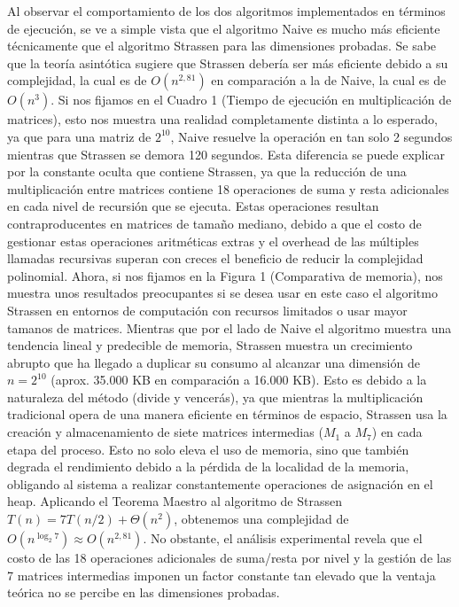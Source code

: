 Al observar el comportamiento de los dos algoritmos implementados en términos de ejecución, se ve a simple vista que el algoritmo Naive es mucho más eficiente técnicamente que el algoritmo Strassen para las dimensiones probadas. Se sabe que la teoría asintótica sugiere que Strassen debería ser más eficiente debido a su complejidad, la cual es de $O(n^{2,81})$ en comparación a la de Naive, la cual es de $O(n^3)$. Si nos fijamos en el Cuadro 1 (Tiempo de ejecución en multiplicación de matrices), esto nos muestra una realidad completamente distinta a lo esperado, ya que para una matriz de $2^{10}$, Naive resuelve la operación en tan solo 2 segundos mientras que Strassen se demora 120 segundos. Esta diferencia se puede explicar por la constante oculta que contiene Strassen, ya que la reducción de una multiplicación entre matrices contiene 18 operaciones de suma y resta adicionales en cada nivel de recursión que se ejecuta. Estas operaciones resultan contraproducentes en matrices de tamaño mediano, debido a que el costo de gestionar estas operaciones aritméticas extras y el overhead de las múltiples llamadas recursivas superan con creces el beneficio de reducir la complejidad polinomial. 
Ahora, si nos fijamos en la Figura 1 (Comparativa de memoria), nos muestra unos resultados preocupantes si se desea usar en este caso el algoritmo Strassen en entornos de computación con recursos limitados o usar mayor tamanos de matrices. Mientras que por el lado de Naive el algoritmo muestra una tendencia lineal y predecible de memoria, Strassen muestra un crecimiento abrupto que ha llegado a duplicar su consumo al alcanzar una dimensión de $n = 2^{10}$ (aprox. 35.000 KB en comparación a 16.000 KB). Esto es debido a la naturaleza del método (divide y vencerás), ya que mientras la multiplicación tradicional opera de una manera eficiente en términos de espacio, Strassen usa la creación y almacenamiento de siete matrices intermedias ($M_1$ a $M_7$) en cada etapa del proceso. Esto no solo eleva el uso de memoria, sino que también degrada el rendimiento debido a la pérdida de la localidad de la memoria, obligando al sistema a realizar constantemente operaciones de asignación en el heap.
Aplicando el Teorema Maestro al algoritmo de Strassen $T(n) = 7T(n/2) + \Theta(n^2)$, obtenemos una complejidad de $O(n^{\log_2 7}) \approx O(n^{2,81})$. No obstante, el análisis experimental revela que el costo de las 18 operaciones adicionales de suma/resta por nivel y la gestión de las 7 matrices intermedias imponen un factor constante tan elevado que la ventaja teórica no se percibe en las dimensiones probadas.

